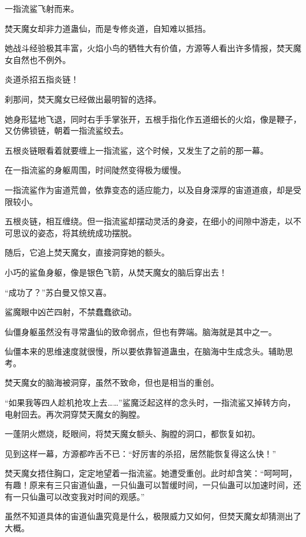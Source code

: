 
\begin{this_body}

一指流鲨飞射而来。

焚天魔女却非力道蛊仙，而是专修炎道，自知难以抵挡。

她战斗经验极其丰富，火焰小鸟的牺牲大有价值，方源等人看出许多情报，焚天魔女自然也不例外。

炎道杀招五指炎链！

刹那间，焚天魔女已经做出最明智的选择。

她身形猛地飞退，同时右手手掌张开，五根手指化作五道细长的火焰，像是鞭子，又仿佛锁链，朝着一指流鲨绞去。

五根炎链眼看着就要缠上一指流鲨，这个时候，又发生了之前的那一幕。

在一指流鲨的身躯周围，时间陡然变得极为缓慢。

一指流鲨作为宙道荒兽，依靠变态的适应能力，以及自身深厚的宙道道痕，却是受限较小。

五根炎链，相互缠绕。但一指流鲨却摆动灵活的身姿，在细小的间隙中游走，以不可思议的姿态，将其统统成功摆脱。

随后，它追上焚天魔女，直接洞穿她的额头。

小巧的鲨鱼身躯，像是银色飞箭，从焚天魔女的脑后穿出去！

“成功了？”苏白曼又惊又喜。

鲨魔眼中凶芒四射，不禁蠢蠢欲动。

仙僵身躯虽然没有寻常蛊仙的致命弱点，但也有弊端。脑海就是其中之一。

仙僵本来的思维速度就很慢，所以要依靠智道蛊虫，在脑海中生成念头。辅助思考。

焚天魔女的脑海被洞穿，虽然不致命，但也是相当的重创。

“如果我等四人趁机抢攻上去……”鲨魔泛起这样的念头时，一指流鲨又掉转方向，电射回去。再次洞穿焚天魔女的胸膛。

一蓬阴火燃烧，眨眼间，将焚天魔女额头、胸膛的洞口，都恢复如初。

见到这样一幕，方源都咋舌不已：“好厉害的杀招，居然能恢复得这么快！”

焚天魔女捂住胸口，定定地望着一指流鲨。她遭受重创。此时却含笑：“呵呵呵，有趣！原来有三只宙道仙蛊，一只仙蛊可以暂缓时间，一只仙蛊可以加速时间，还有一只仙蛊可以改变我对时间的观感。”

虽然不知道具体的宙道仙蛊究竟是什么，极限威力又如何，但焚天魔女却猜测出了大概。


\end{this_body}

